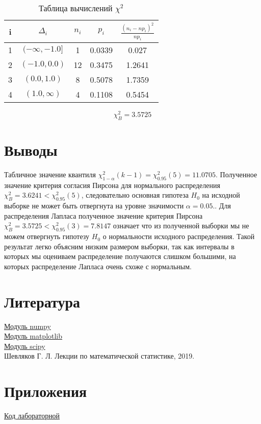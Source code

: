 \documentclass[a4]{article}
\begin{document}
\begin{table}[H]
	\caption{Таблица вычислений $\chi^2$}
	\label{tab:my_label1}
	\begin{center}
		\vspace{5mm}
		\begin{tabular}{|c|c|c|c|c|}
			\hline
			i & $\Delta_i$ & $n_i$ & $p_i$ & $\frac{(n_i-np_i)^2}{np_i}$\\
			\hline
			1&	 $(-\infty, -1.0]$ &	1  &	 0.0339 &	 0.027\\
			\hline
			2&	$(-1.0, 0.0)$&	12&	 0.3475&	  1.2641\\
			\hline
			3& $(0.0, 1.0)$&	8&	 0.5078&	 1.7359\\
			\hline
			4&	$(1.0, \infty)$&	4&	 0.1108&	 0.5454\\
			\hline
			
			\hline
		\end{tabular}
	\end{center}
\end{table}

$$\chi_B^2 = 3.5725$$ 

\section{Выводы}

Табличное значение квантиля  $\chi^2_{1-\alpha}(k-1)=\chi^2_{0.95}(5) = 11.0705$.
Полученное значение критерия согласия Пирсона для нормального распределения $\chi_B^2 = 3.6241 < \chi^2_{0.95}(5)$, следовательно основная гипотеза $H_0$ на исходной выборке не может быть отвергнута на уровне значимости $\alpha = 0.05.$. Для распределения Лапласа полученное значение критерия Пирсона $\chi_B^2 = 3.5725 < \chi^2_{0.95}(3) = 7.8147$ означает что из полученной выборки мы не можем отвергнуть гипотезу $H_0$ о нормальности исходного распределения. Такой результат легко объясним низким размером выборки, так как интервалы в которых мы оцениваем распределение получаются слишком большими, на которых распределение Лапласа очень схоже с нормальным.


\section{Литература}

\href{https://physics.susu.ru/vorontsov/language/numpy.html}{Модуль numpy}\\

\href{https://matplotlib.org/}{Модуль matplotlib}\\

\href{https://www.scipy.org/}{Модуль scipy}\\

Шевляков Г. Л. Лекции по математической статистике, 2019.


\section{Приложения}

\href{https://github.com/Sergey-Sharapov/MatStat_labs/blob/main/lab7/lab7.py}{Код лабораторной}
\end{document}
